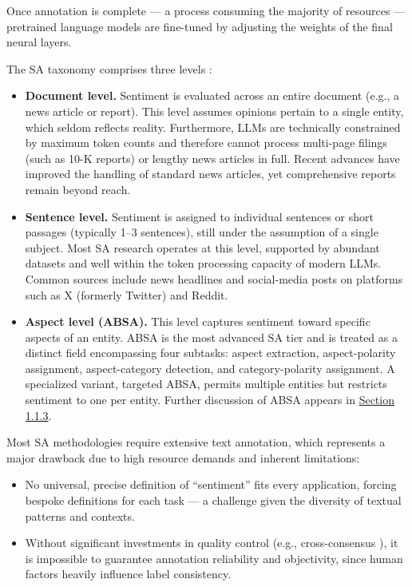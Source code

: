 Once annotation is complete --- a process consuming the majority of resources — pretrained language
models are fine-tuned by adjusting the weights of the final neural layers.

The SA taxonomy comprises three levels \parencite{SA2020taxonomy}:
\begin{itemize}
    \item \textbf{Document level.} Sentiment is evaluated across an entire document (e.g., a news
    article or report). This level assumes opinions pertain to a single entity, which seldom reflects
    reality. Furthermore, LLMs are technically constrained by maximum token counts and therefore cannot
    process multi-page filings (such as 10-K reports) or lengthy news articles in full. Recent advances
    have improved the handling of standard news articles, yet comprehensive reports remain beyond reach.
    \item \textbf{Sentence level.} Sentiment is assigned to individual sentences or short passages
    (typically 1--3 sentences), still under the assumption of a single subject. Most SA research operates
    at this level, supported by abundant datasets and well within the token processing capacity of modern
    LLMs. Common sources include news headlines and social-media posts on platforms such as X (formerly
    Twitter) and Reddit.
    \item \textbf{Aspect level (ABSA).} This level captures sentiment toward specific aspects of an entity.
    ABSA is the most advanced SA tier and is treated as a distinct field encompassing four subtasks: aspect
    extraction, aspect-polarity assignment, aspect-category detection, and category-polarity assignment.
    A specialized variant, targeted ABSA, permits multiple entities but restricts sentiment to one per entity.
    Further discussion of ABSA appears in \hyperref[sec:absa]{Section 1.1.3}.
\end{itemize}

Most SA methodologies require extensive text annotation, which represents a major drawback due to high
resource demands and inherent limitations:
\begin{itemize}
    \item No universal, precise definition of “sentiment” fits every application, forcing bespoke definitions
    for each task — a challenge given the diversity of textual patterns and contexts.
    \item Without significant investments in quality control (e.g., cross-consensus
    \parencite{consensus1997bogdan}), it is impossible to guarantee annotation reliability and objectivity,
    since human factors heavily
    influence label consistency.
\end{itemize}

